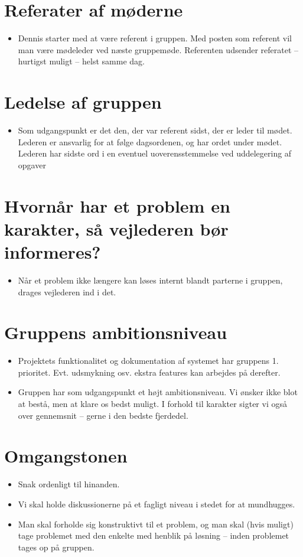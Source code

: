 \section{Referater af møderne}
\begin{itemize}
	\item Dennis starter med at være referent i gruppen. Med posten som referent vil man være mødeleder ved næste gruppemøde. Referenten udsender referatet – hurtigst muligt – helst samme dag.
\end{itemize}

\section{Ledelse af gruppen}
\begin{itemize}
	\item Som udgangspunkt er det den, der var referent sidst, der er leder til mødet. Lederen er ansvarlig for at følge dagsordenen, og har ordet under mødet. Lederen har sidste ord i en eventuel uoverensstemmelse ved uddelegering af opgaver
\end{itemize}

\section{Hvornår har et problem en karakter, så vejlederen bør informeres?}
\begin{itemize}
	\item Når et problem ikke længere kan løses internt blandt parterne i gruppen, drages vejlederen ind i det.
\end{itemize}

\section{Gruppens ambitionsniveau }
\begin{itemize}
	\item Projektets funktionalitet og dokumentation af systemet har gruppens 1. prioritet. Evt. udsmykning osv. ekstra features kan arbejdes på derefter.
	\item Gruppen har som udgangspunkt et højt ambitionsniveau. Vi ønsker ikke blot at bestå, men at klare os bedst muligt. I forhold til karakter sigter vi også over gennemsnit – gerne i den bedste fjerdedel. 
\end{itemize}

\section{Omgangstonen}
\begin{itemize}
	\item Snak ordenligt til hinanden.
	\item Vi skal holde diskussionerne på et fagligt niveau i stedet for at mundhugges.
	\item Man skal forholde sig konstruktivt til et problem, og man skal (hvis muligt) tage problemet med den enkelte med henblik på løsning – inden problemet tages op på gruppen.
\end{itemize}

